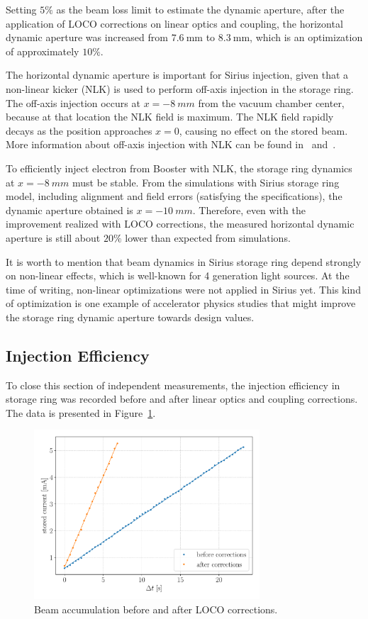 Setting $5\%$ as the beam loss limit to estimate the dynamic aperture, after the application of LOCO corrections on linear optics and coupling, the horizontal dynamic aperture was increased from $\SI{7.6}{\milli\meter}$ to $\SI{8.3}{\milli\meter}$, which is an optimization of approximately $10\%$.

The horizontal dynamic aperture is important for Sirius injection, given that a non-linear kicker (NLK) is used to perform off-axis injection in the storage ring. The off-axis injection occurs at $x=\SI{-8}{mm}$ from the vacuum chamber center, because at that location the NLK field is maximum. The NLK field rapidly decays as the position approaches $x=0$, causing no effect on the stored beam. More information about off-axis injection with NLK can be found in~\cite{liu2016a} and~\cite{wikinlk}.

To efficiently inject electron from Booster with NLK, the storage ring dynamics at $x=\SI{-8}{mm}$ must be stable. From the simulations with Sirius storage ring model, including alignment and field errors (satisfying the specifications), the dynamic aperture obtained is $x=\SI{-10}{mm}$. Therefore, even with the improvement realized with LOCO corrections, the measured horizontal dynamic aperture is still about $20\%$ lower than expected from simulations. 

It is worth to mention that beam dynamics in Sirius storage ring depend strongly on non-linear effects, which is well-known for 4 generation light sources. At the time of writing, non-linear optimizations were not applied in Sirius yet. This kind of optimization is one example of accelerator physics studies that might improve the storage ring dynamic aperture towards design values.

\subsection{Injection Efficiency}
To close this section of independent measurements, the injection efficiency in storage ring was recorded before and after linear optics and coupling corrections. The data is presented in Figure~\ref{fig:injeff}.
\begin{figure}[h!]
\centering
\includegraphics[width=0.75\textwidth]{figures/injeff_grid.pdf}
\caption{Beam accumulation before and after LOCO corrections.}
\label{fig:injeff}
\end{figure}

